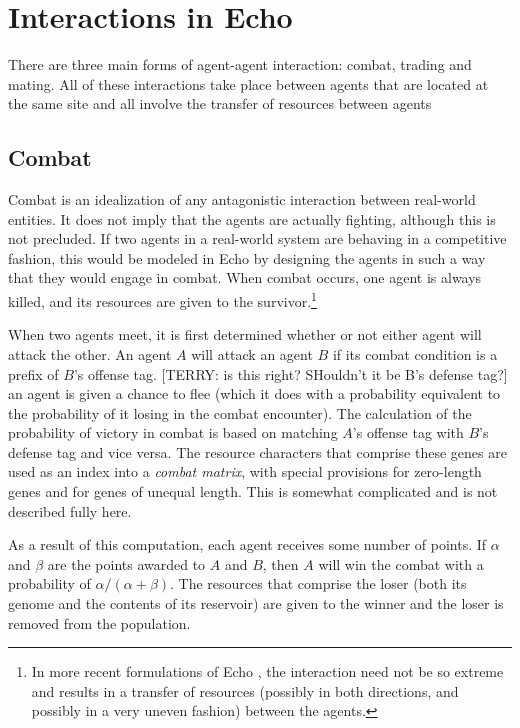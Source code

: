 \section{Interactions in Echo}
\label{echo-interactions}
\label{agent-agent}

There are three main forms of agent-agent interaction: combat, trading
and mating. All of these interactions take place between agents
that are located at the same site and all involve the transfer of
resources between agents

\subsection{Combat}
\label{dynamics:combat}

Combat is an idealization of any antagonistic interaction between
real-world entities. It does not imply that the agents are actually
fighting, although this is not precluded. If two agents in a
real-world system are behaving in a competitive fashion, this would be
modeled in Echo by designing the agents in such a way that they would
engage in combat. When combat occurs, one agent is always killed, and
its resources are given to the survivor.\footnote{In more recent formulations
of Echo \cite{Holland94,Holland95a}, the interaction need not be so
extreme and results in a transfer of resources (possibly in both
directions, and possibly in a very uneven fashion) between the agents.}

When two agents meet, it is first determined whether or not either
agent will attack the other.  An agent $A$ will attack an agent $B$ if
its combat condition is a prefix of $B$'s offense tag.  [TERRY: is
this right?  SHouldn't it be B's defense tag?]  an agent is given a
chance to flee (which it does with a probability equivalent to the
probability of it losing in the combat encounter).  The calculation of
the probability of victory in combat is based on matching $A$'s
offense tag with $B$'s defense tag and vice versa. The resource
characters that comprise these genes are used as an index into a {\em
combat matrix}, with special provisions for zero-length genes and for
genes of unequal length.  This is somewhat complicated and is not
described fully here.

As a result of this computation, each agent receives some number of
points. If $\alpha$ and $\beta$ are the points awarded to $A$ and $B$,
then $A$ will win the combat with a probability of $\alpha / (\alpha +
\beta)$.  The resources that comprise the loser (both its genome and
the contents of its reservoir) are given to the winner and the loser
is removed from the population.

